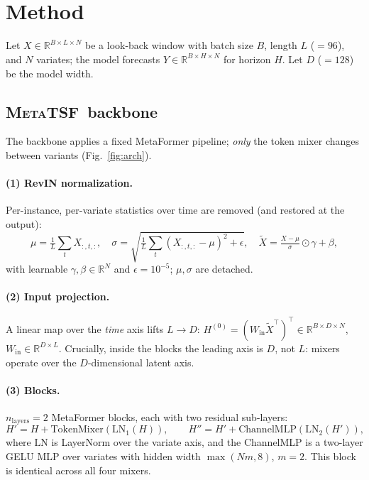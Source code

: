 \documentclass[11pt]{article}
\newcommand{\mtsf}{\textsc{MetaTSF}}
\begin{document}
\section{Method}
\label{sec:method}

Let $X\in\mathbb{R}^{B\times L\times N}$ be a look-back window with batch size
$B$, length $L$ ($=96$), and $N$ variates; the model forecasts
$\hat Y\in\mathbb{R}^{B\times H\times N}$ for horizon $H$. Let $D$ ($=128$) be the
model width.

\subsection{\mtsf\ backbone}

The backbone applies a fixed MetaFormer pipeline; \emph{only} the token mixer
changes between variants (Fig.~\ref{fig:arch}).

\paragraph{(1) RevIN normalization.} Per-instance, per-variate statistics over
time are removed (and restored at the output):
\begin{equation}
\mu=\tfrac1L\textstyle\sum_t X_{:,t,:},\quad
\sigma=\sqrt{\tfrac1L\sum_t (X_{:,t,:}-\mu)^2+\epsilon},\quad
\tilde X=\tfrac{X-\mu}{\sigma}\odot\gamma+\beta,
\end{equation}
with learnable $\gamma,\beta\in\mathbb{R}^N$ and $\epsilon{=}10^{-5}$;
$\mu,\sigma$ are detached.

\paragraph{(2) Input projection.} A linear map over the \emph{time} axis lifts
$L\!\to\!D$: $H^{(0)}=(W_{\mathrm{in}}\tilde X^\top)^\top\in\mathbb{R}^{B\times D\times N}$,
$W_{\mathrm{in}}\in\mathbb{R}^{D\times L}$. Crucially, inside the blocks the
leading axis is $D$, not $L$: mixers operate over the $D$-dimensional latent axis.

\paragraph{(3) Blocks.} $n_{\mathrm{layers}}{=}2$ MetaFormer blocks, each with two
residual sub-layers:
\begin{equation}
H' = H + \mathrm{TokenMixer}(\mathrm{LN}_1(H)),\qquad
H'' = H' + \mathrm{ChannelMLP}(\mathrm{LN}_2(H')),
\end{equation}
where $\mathrm{LN}$ is LayerNorm over the variate axis, and the ChannelMLP is a
two-layer GELU MLP over variates with hidden width $\max(N m,8)$, $m{=}2$. This
block is identical across all four mixers.
\end{document}
